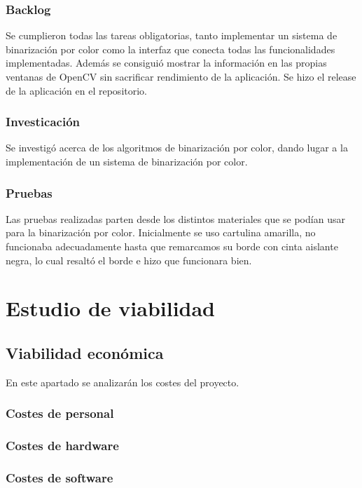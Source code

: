 \subsubsection{Backlog}
Se cumplieron todas las tareas obligatorias, tanto implementar un sistema de binarización por color como la interfaz que conecta todas las funcionalidades implementadas. Además se consiguió mostrar la información en las propias ventanas de OpenCV sin sacrificar rendimiento de la aplicación. Se hizo el release de la aplicación en el repositorio.

\subsubsection{Investicación}
Se investigó acerca de los algoritmos de binarización por color, dando lugar a la implementación de un sistema de binarización por color.

\subsubsection{Pruebas}
Las pruebas realizadas parten desde los distintos materiales que se podían usar para la binarización por color. Inicialmente se uso cartulina amarilla, no funcionaba adecuadamente hasta que remarcamos su borde con cinta aislante negra, lo cual resaltó el borde e hizo que funcionara bien.


\section{Estudio de viabilidad}

\subsection{Viabilidad económica}
En este apartado se analizarán los costes del proyecto.

\subsubsection{Costes de personal}

\subsubsection{Costes de hardware}

\subsubsection{Costes de software}

